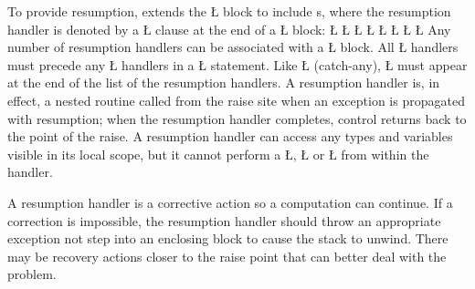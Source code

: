 \documentclass[openright,twoside]{report}
\begin{document}
To provide resumption, \uC extends the \LGinlinetrue\LGbegin\lgrinde\L{}\endlgrinde\LGend{} block to include s, where the resumption handler is denoted by a \LGinlinetrue\LGbegin\lgrinde\L{}\endlgrinde\LGend{} clause at the end of a \LGinlinetrue\LGbegin\lgrinde\L{}\endlgrinde\LGend{} block:
\LGinlinefalse\LGbegin\lgrinde
\L{}
\L{\LB{}}
\L{\LB{\}}}
\CE{}\L{\LB{}}
\CE{}\L{\LB{}}
\CE{}\L{\LB{}}
\CE{}\L{\LB{}}
\CE{}\L{\LB{}}
\CE{}\endlgrinde\LGend
{}%
Any number of resumption handlers can be associated with a \LGinlinetrue\LGbegin\lgrinde\L{}\endlgrinde\LGend{} block.
All \LGinlinetrue\LGbegin\lgrinde\L{}\endlgrinde\LGend{} handlers must precede any \LGinlinetrue\LGbegin\lgrinde\L{}\endlgrinde\LGend{} handlers in a \LGinlinetrue\LGbegin\lgrinde\L{}\endlgrinde\LGend{} statement.
Like \LGinlinetrue\LGbegin\lgrinde\L{}\endlgrinde\LGend{} (catch-any), \LGinlinetrue\LGbegin\lgrinde\L{}\endlgrinde\LGend{} must appear at the end of the list of the resumption handlers.
A resumption handler is, in effect, a nested routine called from the raise site when an exception is propagated with resumption;
when the resumption handler completes, control returns back to the point of the raise.
A resumption handler can access any types and variables visible in its local scope, but it cannot perform a \LGinlinetrue\LGbegin\lgrinde\L{}\endlgrinde\LGend{}, \LGinlinetrue\LGbegin\lgrinde\L{}\endlgrinde\LGend{} or \LGinlinetrue\LGbegin\lgrinde\L{}\endlgrinde\LGend{} from within the handler.

\begin{annotation}
A resumption handler is a corrective action so a computation can continue.
If a correction is impossible, the resumption handler should throw an appropriate exception not step into an enclosing block to cause the stack to unwind.
There may be recovery actions closer to the raise point that can better deal with the problem.
\end{annotation}
\end{document}
